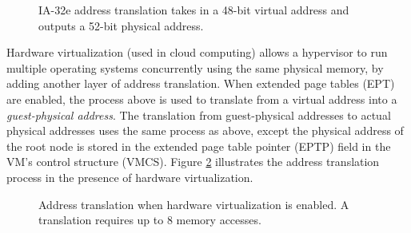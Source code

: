 \begin{figure}[hbtp]
  \caption{
    IA-32e address translation takes in a 48-bit virtual address and outputs
    a 52-bit physical address.
  }
  \label{fig:os_paging}
\end{figure}

Hardware virtualization (used in cloud computing) allows a hypervisor to run
multiple operating systems concurrently using the same physical memory, by
adding another layer of address translation. When extended page tables (EPT)
are enabled, the process above is used to translate from a virtual address into
a \textit{guest-physical address}. The translation from guest-physical
addresses to actual physical addresses uses the same process as above, except
the physical address of the root node is stored in the extended page table
pointer (EPTP) field in the VM's control structure (VMCS). Figure
\ref{fig:vmx_paging} illustrates the address translation process in the
presence of hardware virtualization.

\begin{figure}[hbtp]
  \caption{
    Address translation when hardware virtualization is enabled. A translation
    requires up to 8 memory accesses.
  }
  \label{fig:vmx_paging}
\end{figure}

